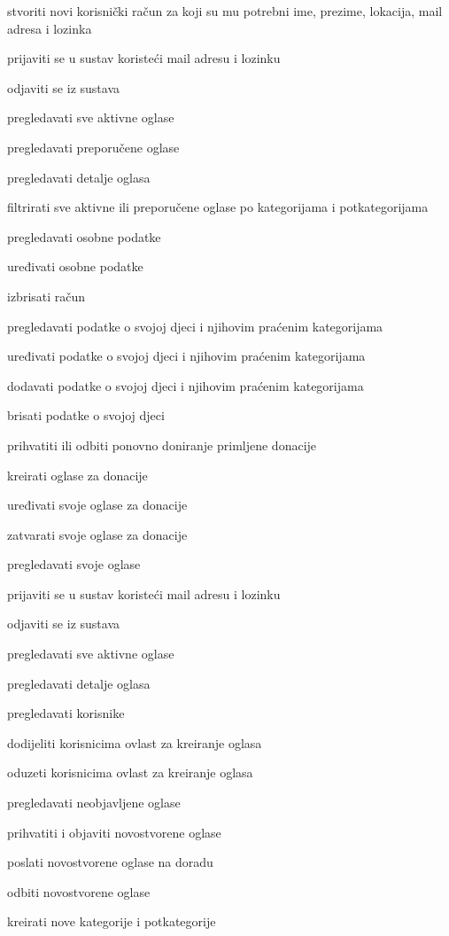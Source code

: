 \begin{packed_enum}
				\begin{packed_enum}
					\item stvoriti novi korisnički račun za koji su mu potrebni ime, prezime, lokacija, mail adresa i lozinka
					\item prijaviti se u sustav koristeći mail adresu i lozinku
					\item odjaviti se iz sustava
					\item pregledavati sve aktivne oglase
					\item pregledavati preporučene oglase
					\item pregledavati detalje oglasa
					\item filtrirati sve aktivne ili preporučene oglase po kategorijama i potkategorijama
					\item pregledavati osobne podatke
					\item uređivati osobne podatke
					\item izbrisati račun
					\item pregledavati podatke o svojoj djeci i njihovim praćenim kategorijama
					\item uređivati podatke o svojoj djeci i njihovim praćenim kategorijama
					\item dodavati podatke o svojoj djeci i njihovim praćenim kategorijama
					\item brisati podatke o svojoj djeci
					\item prihvatiti ili odbiti ponovno doniranje primljene donacije
					\item kreirati oglase za donacije
					\item uređivati svoje oglase za donacije 
					\item zatvarati svoje oglase za donacije
					\item pregledavati svoje oglase
				\end{packed_enum}

				\item  {}
				
				\begin{packed_enum}
					\item prijaviti se u sustav koristeći mail adresu i lozinku
					\item odjaviti se iz sustava
					\item pregledavati sve aktivne oglase
					\item pregledavati detalje oglasa
					\item pregledavati korisnike
					\item dodijeliti korisnicima ovlast za kreiranje oglasa
					\item oduzeti korisnicima ovlast za kreiranje oglasa
					\item pregledavati neobjavljene oglase
					\item prihvatiti i objaviti novostvorene oglase
					\item poslati novostvorene oglase na doradu
					\item odbiti novostvorene oglase
					\item kreirati nove kategorije i potkategorije
					

\end{packed_enum}
\end{packed_enum}

